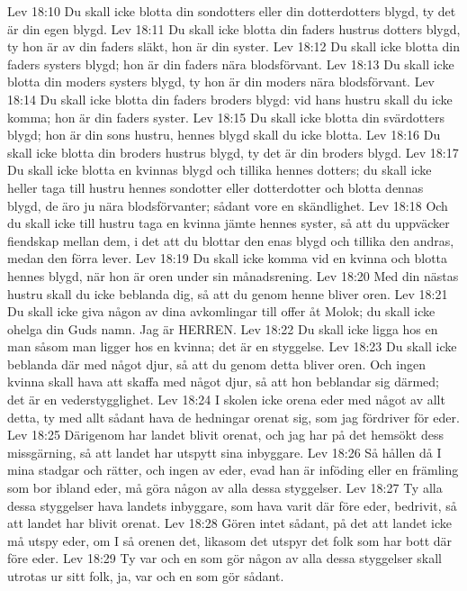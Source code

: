Lev 18:10  Du skall icke blotta din sondotters eller din dotterdotters blygd, ty det är din egen blygd.
Lev 18:11  Du skall icke blotta din faders hustrus dotters blygd, ty hon är av din faders släkt, hon är din syster.
Lev 18:12  Du skall icke blotta din faders systers blygd; hon är din faders nära blodsförvant.
Lev 18:13  Du skall icke blotta din moders systers blygd, ty hon är din moders nära blodsförvant.
Lev 18:14  Du skall icke blotta din faders broders blygd: vid hans hustru skall du icke komma; hon är din faders syster.
Lev 18:15  Du skall icke blotta din svärdotters blygd; hon är din sons hustru, hennes blygd skall du icke blotta.
Lev 18:16  Du skall icke blotta din broders hustrus blygd, ty det är din broders blygd.
Lev 18:17  Du skall icke blotta en kvinnas blygd och tillika hennes dotters; du skall icke heller taga till hustru hennes sondotter eller dotterdotter och blotta dennas blygd, de äro ju nära blodsförvanter; sådant vore en skändlighet.
Lev 18:18  Och du skall icke till hustru taga en kvinna jämte hennes syster, så att du uppväcker fiendskap mellan dem, i det att du blottar den enas blygd och tillika den andras, medan den förra lever.
Lev 18:19  Du skall icke komma vid en kvinna och blotta hennes blygd, när hon är oren under sin månadsrening.
Lev 18:20  Med din nästas hustru skall du icke beblanda dig, så att du genom henne bliver oren.
Lev 18:21  Du skall icke giva någon av dina avkomlingar till offer åt Molok; du skall icke ohelga din Guds namn. Jag är HERREN.
Lev 18:22  Du skall icke ligga hos en man såsom man ligger hos en kvinna; det är en styggelse.
Lev 18:23  Du skall icke beblanda där med något djur, så att du genom detta bliver oren. Och ingen kvinna skall hava att skaffa med något djur, så att hon beblandar sig därmed; det är en vederstygglighet.
Lev 18:24  I skolen icke orena eder med något av allt detta, ty med allt sådant hava de hedningar orenat sig, som jag fördriver för eder.
Lev 18:25  Därigenom har landet blivit orenat, och jag har på det hemsökt dess missgärning, så att landet har utspytt sina inbyggare.
Lev 18:26  Så hållen då I mina stadgar och rätter, och ingen av eder, evad han är inföding eller en främling som bor ibland eder, må göra någon av alla dessa styggelser.
Lev 18:27  Ty alla dessa styggelser hava landets inbyggare, som hava varit där före eder, bedrivit, så att landet har blivit orenat.
Lev 18:28  Gören intet sådant, på det att landet icke må utspy eder, om I så orenen det, likasom det utspyr det folk som har bott där före eder.
Lev 18:29  Ty var och en som gör någon av alla dessa styggelser skall utrotas ur sitt folk, ja, var och en som gör sådant.
